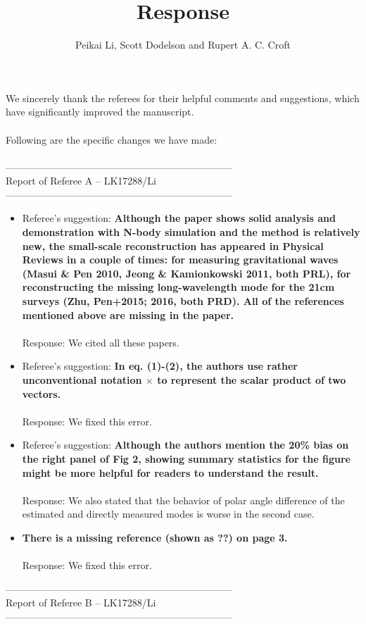 \documentclass{article}
\title{Response}
\author{Peikai Li, Scott Dodelson and Rupert A. C. Croft}
\date{}
\begin{document}
\maketitle
\noindent We sincerely thank the referees for their helpful comments and suggestions, which have significantly improved the manuscript.\\ \\
Following are the specific changes we have made:\\ \\
---------------------------------------------------------------------\\
Report of Referee A -- LK17288/Li\\
---------------------------------------------------------------------\\
\begin{itemize}
\item Referee's suggestion: \textbf{Although the paper shows solid analysis and demonstration with N-body
simulation and the method is relatively new, the small-scale
reconstruction has appeared in Physical Reviews in a couple of times:
for measuring gravitational waves (Masui \& Pen 2010, Jeong \&
Kamionkowski 2011, both PRL), for reconstructing the missing
long-wavelength mode for the 21cm surveys (Zhu, Pen+2015; 2016, both
PRD). All of the references mentioned above are missing in the paper.} \\ \\
Response: We cited all these papers.
\item Referee's suggestion: \textbf{In eq. (1)-(2), the authors use rather unconventional notation
$\times$ to represent the scalar product of two vectors.}
\\ \\Response: We fixed this error. 
\item Referee's suggestion: \textbf{Although the authors mention the 20\% bias on the right panel of Fig
2, showing summary statistics for the figure might be more helpful for
readers to understand the result.}
\\ \\Response: We also stated that the behavior of polar angle difference of the estimated and directly measured modes is worse in the second case. 
\item \textbf{There is a missing reference (shown as ??) on page 3.}\\ \\
Response: We fixed this error.\\

\end{itemize} 
---------------------------------------------------------------------\\
Report of Referee B -- LK17288/Li\\
---------------------------------------------------------------------\\
\end{document}
